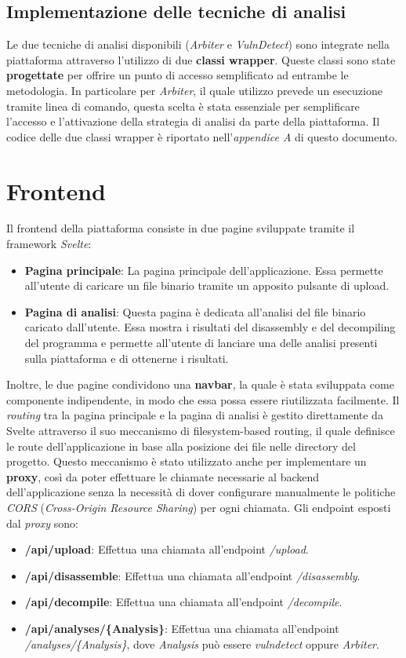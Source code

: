 \documentclass[../main.tex]{subfiles}
\begin{document}
\subsection{Implementazione delle tecniche di analisi}
Le due tecniche di analisi disponibili (\textit{Arbiter} e \textit{VulnDetect}) sono integrate nella piattaforma
attraverso l'utilizzo di due \textbf{classi wrapper}. Queste classi sono state \textbf{progettate} per offrire un
punto di accesso semplificato ad entrambe le metodologia. In particolare per \textit{Arbiter}, il quale utilizzo prevede un esecuzione
tramite linea di comando, questa scelta è stata essenziale per semplificare l'accesso e l'attivazione della strategia di analisi da parte della piattaforma.
Il codice delle due classi wrapper è riportato nell'\textit{appendice A} di questo documento.
\section{Frontend}
Il frontend della piattaforma consiste in due pagine sviluppate tramite il framework \textit{Svelte}:
\begin{itemize}
    \item \textbf{Pagina principale}: La pagina principale dell'applicazione. Essa permette all'utente di caricare un file binario tramite un apposito pulsante di upload.
    \item \textbf{Pagina di analisi}: Questa pagina è dedicata all'analisi del file binario caricato dall'utente. Essa mostra i risultati del disassembly e del decompiling
    del programma e permette all'utente di lanciare una delle analisi presenti sulla piattaforma e di ottenerne i risultati.
\end{itemize}
Inoltre, le due pagine condividono una \textbf{navbar}, la quale è stata sviluppata come componente indipendente, in modo che essa possa essere riutilizzata facilmente.
Il \textit{routing} tra la pagina principale e la pagina di analisi è gestito direttamente da Svelte attraverso il suo meccanismo di filesystem-based routing, 
il quale definisce le route dell'applicazione in base alla posizione dei file nelle directory del progetto. Questo meccanismo è stato utilizzato anche per implementare un \textbf{proxy},
così da poter effettuare le chiamate necessarie al backend dell'applicazione senza la necessità di dover configurare manualmente le politiche \textit{CORS} (\textit{Cross-Origin Resource Sharing}) per ogni chiamata. 
Gli endpoint esposti dal \textit{proxy} sono:
\begin{itemize}
    \item \textbf{/api/upload}: Effettua una chiamata all'endpoint \textit{/upload}.
    \item \textbf{/api/disassemble}: Effettua una chiamata all'endpoint \textit{/disassembly}.
    \item \textbf{/api/decompile}: Effettua una chiamata all'endpoint \textit{/decompile}.
    \item \textbf{/api/analyses/\{Analysis\}}: Effettua una chiamata all'endpoint \textit{/analyses/\{Analysis\}}, dove \textit{Analysis} può essere \textit{vulndetect} oppure \textit{Arbiter}.
\end{itemize}
\end{document}
